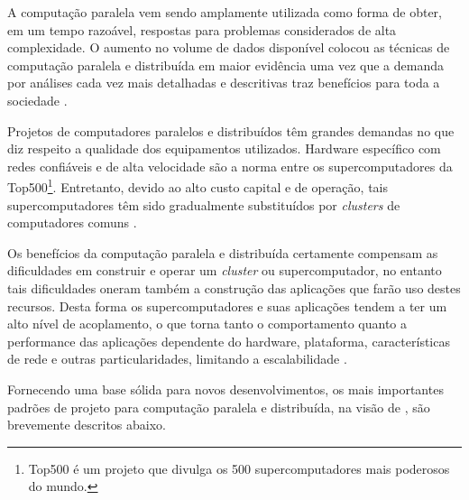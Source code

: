 \documentclass[english,brazilian]{UNISINOSmonografia} %
\begin{document}
A computação paralela vem sendo amplamente utilizada como forma de obter, em um tempo razoável, respostas para problemas considerados de alta complexidade.
O aumento no volume de dados disponível colocou as técnicas de computação paralela e distribuída em maior evidência uma vez que a demanda por análises cada vez mais detalhadas e descritivas traz benefícios para toda a sociedade \cite{wilkinson1999parallel}.


Projetos de computadores paralelos e distribuídos têm grandes demandas no que diz respeito a qualidade dos equipamentos utilizados. 
Hardware específico com redes confiáveis e de alta velocidade são a norma entre os supercomputadores da Top500\footnote{
	Top500 é um projeto que divulga os 500 supercomputadores mais poderosos do mundo.
}.
Entretanto, devido ao alto custo capital e de operação, tais supercomputadores têm sido gradualmente substituídos por \textit{clusters} de computadores comuns \cite{Baker1999}.


Os benefícios da computação paralela e distribuída certamente compensam as dificuldades em construir e operar um \textit{cluster} ou supercomputador, no entanto tais dificuldades oneram também a construção das aplicações que farão uso destes recursos. 
Desta forma os supercomputadores e suas aplicações tendem a ter um alto nível de acoplamento, o que torna tanto o comportamento quanto a performance das aplicações dependente do hardware, plataforma, características de rede e outras particularidades, limitando a escalabilidade \cite{Rajan2011}.

Fornecendo uma base sólida para novos desenvolvimentos, os mais importantes padrões de projeto para computação paralela e distribuída, na visão de , são brevemente descritos abaixo.
\end{document}
